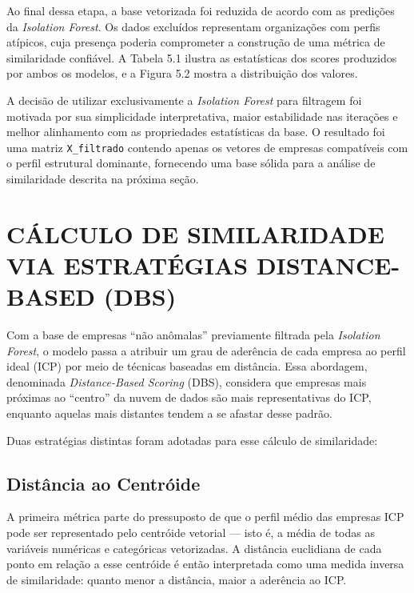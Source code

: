 Ao final dessa etapa, a base vetorizada foi reduzida de acordo com as predições da \textit{Isolation Forest}. Os dados excluídos representam organizações com perfis atípicos, cuja presença poderia comprometer a construção de uma métrica de similaridade confiável. A Tabela 5.1 ilustra as estatísticas dos scores produzidos por ambos os modelos, e a Figura 5.2 mostra a distribuição dos valores.



A decisão de utilizar exclusivamente a \textit{Isolation Forest} para filtragem foi motivada por sua simplicidade interpretativa, maior estabilidade nas iterações e melhor alinhamento com as propriedades estatísticas da base. O resultado foi uma matriz \texttt{X\_filtrado} contendo apenas os vetores de empresas compatíveis com o perfil estrutural dominante, fornecendo uma base sólida para a análise de similaridade descrita na próxima seção.

\section{CÁLCULO DE SIMILARIDADE VIA ESTRATÉGIAS DISTANCE-BASED (DBS)}

Com a base de empresas ``não anômalas'' previamente filtrada pela \textit{Isolation Forest}, o modelo passa a atribuir um grau de aderência de cada empresa ao perfil ideal (ICP) por meio de técnicas baseadas em distância. Essa abordagem, denominada \textit{Distance-Based Scoring} (DBS), considera que empresas mais próximas ao ``centro'' da nuvem de dados são mais representativas do ICP, enquanto aquelas mais distantes tendem a se afastar desse padrão.

Duas estratégias distintas foram adotadas para esse cálculo de similaridade:

\subsection{\textbf{Distância ao Centróide}}

A primeira métrica parte do pressuposto de que o perfil médio das empresas ICP pode ser representado pelo centróide vetorial — isto é, a média de todas as variáveis numéricas e categóricas vetorizadas. A distância euclidiana de cada ponto em relação a esse centróide é então interpretada como uma medida inversa de similaridade: quanto menor a distância, maior a aderência ao ICP.

